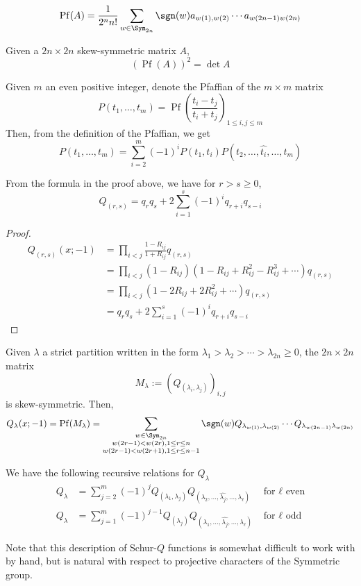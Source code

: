 \documentclass[11pt,leqno,oneside]{amsart}
\numberwithin{thm}{section}
\DeclareMathOperator{\Pf}{Pf}
\begin{document}
\begin{lem}
  \[
    \Pf(A) = \frac{1}{2^n n!}\sum_{w \in \Sym_{2n}} \sgn(w) a_{w(1),w(2)} \cdots a_{w(2n-1)w(2n)}
  \]
\end{lem}
\begin{prop}
  Given a \(2n \times 2n\) skew-symmetric matrix \(A\), \[
    (\Pf(A))^2 = \det A
  \]
\end{prop}
\begin{lem}
  Given \(m\) an even positive integer, denote the Pfaffian of the
  \(m \times m\) matrix \[
    P(t_1, \ldots, t_m) = \Pf \left(\frac{t_i-t_j}{t_i+t_j}  \right)_{1 \leq i,j \leq m}
  \]
  Then, from the definition of the Pfaffian, we get \[
    P(t_1, \ldots, t_m) = \sum_{i=2}^m (-1)^i P(t_1, t_i) P(t_2,
    \ldots, \hat{t_i}, \ldots, t_m)
  \]
\end{lem}
\begin{lem}
  From the formula in the proof above, we have for \(r > s
  \geq 0\), \[
    Q_{(r,s)} = q_r q_s + 2 \sum_{i=1}^s (-1)^i q_{r+i}q_{s-i}
  \]
\end{lem}
\begin{proof}
  \begin{align*}
    Q_{(r,s)}(x;-1)
    & = \prod_{i < j} \frac{1-R_{ij}}{1+R_{ij}} q_{(r,s)} \\
    & = \prod_{i < j} (1-R_{ij})(1-R_{ij}+R_{ij}^2-R_{ij}^3+\cdots)
      q_{(r,s)} \\
    & = \prod_{i < j} (1-2R_{ij}+2R_{ij}^2+\cdots) q_{(r,s)}\\
    & = q_r q_s + 2 \sum_{i=1}^s (-1)^i q_{r+i}q_{s-i}
  \end{align*}
\end{proof}
\begin{prop}
  Given \(\lambda\) a strict partition written in the form \(\lambda_1
  > \lambda_2 > \cdots > \lambda_{2n} \geq 0\), the \(2n \times 2n\)
  matrix \[
    M_\lambda := (Q_{(\lambda_i,\lambda_j)})_{i,j}
  \]
  is skew-symmetric. Then, \[
    Q_\lambda(x;-1) = \Pf(M_\lambda) = \sum_{\substack{w \in
      \Sym_{2n} \\ w(2r-1) < w(2r), 1 \leq r \leq n \\ w(2r-1) < w(2r+1),
    1 \leq r \leq n-1}} \sgn(w) Q_{\lambda_{w(1)}, \lambda_{w(2)}} \cdots
    Q_{\lambda_{w(2n-1)} \lambda_{w(2n)}}
  \]
\end{prop}
\begin{cor}
  We have the following recursive relations for \(Q_\lambda\)
  \begin{align*}
    Q_\lambda & = \sum_{j=2}^m (-1)^j Q_{(\lambda_1, \lambda_j)}
                Q_{(\lambda_2, \ldots, \hat{\lambda_j}, \ldots,
                \lambda_\ell)} & \text{ for }\ell \text{ even} \\
    Q_\lambda & = \sum_{j=1}^m (-1)^{j-1} Q_{(\lambda_j)} Q_{(\lambda_1,
                \ldots, \hat{\lambda_j}, \ldots, \lambda_\ell)}
                            & \text{ for }\ell\text{ odd}
  \end{align*}
\end{cor}
Note that this description of Schur-\(Q\) functions is somewhat
difficult to work with by hand, but is natural with respect to
projective characters of the Symmetric group. 
\end{document}
